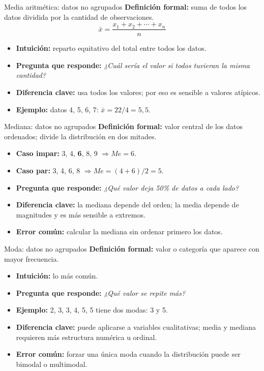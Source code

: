\documentclass[aspectratio=169,11pt]{beamer}
\newcommand{\pregunta}[1]{\textbf{Pregunta que responde:} \emph{#1}}
\newcommand{\errorcomun}[1]{\textbf{Error común:} #1}
\newcommand{\diferencia}[1]{\textbf{Diferencia clave:} #1}
\begin{document}
\begin{frame}{Media aritmética: datos no agrupados}
\textbf{Definición formal:} suma de todos los datos dividida por la cantidad de observaciones.
\[
\bar{x}=\frac{x_1+x_2+\cdots+x_n}{n}
\]
\begin{itemize}
  \item \textbf{Intuición:} reparto equitativo del total entre todos los datos.
  \item \pregunta{¿Cuál sería el valor si todos tuvieran la misma cantidad?}
  \item \diferencia{usa todos los valores; por eso es sensible a valores atípicos.}
  \item \textbf{Ejemplo:} datos 4, 5, 6, 7: $\bar{x}=22/4=5{,}5$.
\end{itemize}
\end{frame}

\begin{frame}{Mediana: datos no agrupados}
\textbf{Definición formal:} valor central de los datos ordenados; divide la distribución en dos mitades.
\begin{itemize}
  \item \textbf{Caso impar:} 3, 4, \textbf{6}, 8, 9 $\Rightarrow Me=6$.
  \item \textbf{Caso par:} 3, 4, 6, 8 $\Rightarrow Me=(4+6)/2=5$.
  \item \pregunta{¿Qué valor deja 50\% de datos a cada lado?}
  \item \diferencia{la mediana depende del orden; la media depende de magnitudes y es más sensible a extremos.}
  \item \errorcomun{calcular la mediana sin ordenar primero los datos.}
\end{itemize}
\end{frame}

\begin{frame}{Moda: datos no agrupados}
\textbf{Definición formal:} valor o categoría que aparece con mayor frecuencia.
\begin{itemize}
  \item \textbf{Intuición:} lo más común.
  \item \pregunta{¿Qué valor se repite más?}
  \item \textbf{Ejemplo:} 2, 3, 3, 4, 5, 5 tiene dos modas: 3 y 5.
  \item \diferencia{puede aplicarse a variables cualitativas; media y mediana requieren más estructura numérica u ordinal.}
  \item \errorcomun{forzar una única moda cuando la distribución puede ser bimodal o multimodal.}
\end{itemize}
\end{frame}
\end{document}

